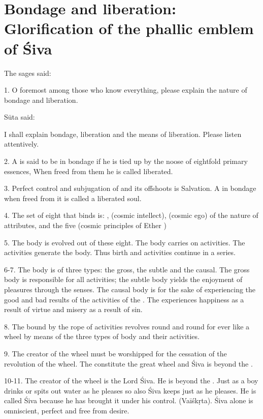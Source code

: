 \chapter{Bondage and liberation: Glorification of the phallic emblem of Śiva}

The sages said:

1. O foremost among those who know everything, please explain the nature of
bondage and liberation.

Sūta said:

I shall explain bondage, liberation and the means of liberation. Please listen
attentively.

2. A  is said to be in bondage if he is tied up by the noose of
eightfold primary essences,  \etc When freed from them he is called
liberated.

3. Perfect control and subjugation of  and its offshoots is
Salvation. A  in bondage when freed from it is called a liberated soul.

4. The set of eight that binds is: ,  (cosmic intellect),
 (cosmic ego) of the nature of attributes, and the five
 (cosmic principles of Ether \etc)

5. The body is evolved out of these eight. The body carries on activities.
The activities generate the body. Thus birth and activities continue in
a series.

6-7. The body is of three types: the gross, the subtle and the causal. The gross
body is responsible for all activities; the subtle body yields the enjoyment of
pleasures through the senses. The causal body is for the sake of experiencing
the good and bad results of the activities of the . The 
experiences happiness as a result of virtue and misery as a result of sin.

8. The  bound by the rope of activities revolves round and round for
ever like a wheel by means of the three types of body and their activities.

9. The creator of the wheel must be worshipped for the cessation of
the revolution of the wheel. The  \etc constitute the great wheel
and Śiva is beyond the .

10-11. The creator of the wheel is the Lord Śiva. He is beyond the .
Just as a boy drinks or spits out water as he pleases so also Śiva keeps
 \etc just as he pleases. He is called Śiva because he has brought
it under his control. (Vaīśkṛta). Śiva alone is omniscient, perfect and free
from desire.


